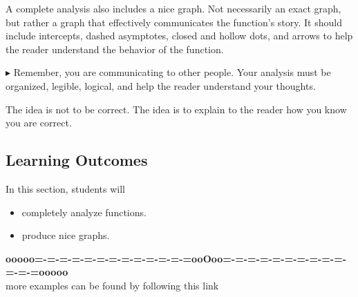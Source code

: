 \documentclass{ximera}
\begin{document}
A complete analysis also includes a nice graph.  Not necessarily an exact graph, but rather a graph that effectively communicates the function's story. It should include intercepts, dashed asymptotes, closed and hollow dots, and arrows to help the reader understand the behavior of the function.  

\textbf{\textcolor{red!80!black}{$\blacktriangleright$}}  Remember, you are communicating to other people. Your analysis must be organized, legible, logical, and help the reader understand your thoughts.

The idea is not to be correct.  The idea is to explain to the reader how you know you are correct.

















\subsection{Learning Outcomes}





\begin{sectionOutcomes}
In this section, students will 

\begin{itemize}
\item completely analyze functions.
\item produce nice graphs.
\end{itemize}
\end{sectionOutcomes}
















\begin{center}
\textbf{\textcolor{green!50!black}{ooooo=-=-=-=-=-=-=-=-=-=-=-=-=ooOoo=-=-=-=-=-=-=-=-=-=-=-=-=ooooo}} \\

more examples can be found by following this link\\ 

\end{center}
\end{document}
